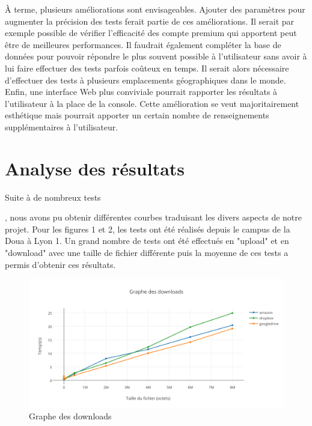 \documentclass[10pt]{article}
\begin{document}
À terme, plusieurs améliorations sont envisageables. Ajouter des
paramètres pour augmenter la précision des tests ferait partie de ces
améliorations. Il serait par exemple possible de vérifier l'efficacité
des compte premium qui apportent peut être de meilleures
performances. Il faudrait également compléter la base de données pour
pouvoir répondre le plus souvent possible à l'utilisateur sans avoir à
lui faire effectuer des tests parfois coûteux en temps. Il serait
alors nécessaire d'effectuer des tests à plusieurs emplacements
géographiques dans le monde. Enfin, une interface Web plus conviviale
pourrait rapporter les résultats à l'utilisateur à la place de la
console. Cette amélioration se veut majoritairement esthétique mais
pourrait apporter un certain nombre de renseignements supplémentaires
à l'utilisateur.

\section{Analyse des résultats}

Suite à de nombreux tests

  , nous avons pu obtenir différentes courbes
traduisant les divers aspects de notre projet. Pour les figures 1 et
2, les tests ont été réalisés depuis le campus de la Doua à Lyon 1. Un
grand nombre de tests ont été effectués en "upload" et en "download"
avec une taille de fichier différente puis la moyenne de ces tests a
permis d'obtenir ces résultats.

\begin{figure}[h]
\centering
\includegraphics[scale=0.7]{graphe_des_downloads.png}
\caption{Graphe des downloads}
\end{figure}
\end{document}
